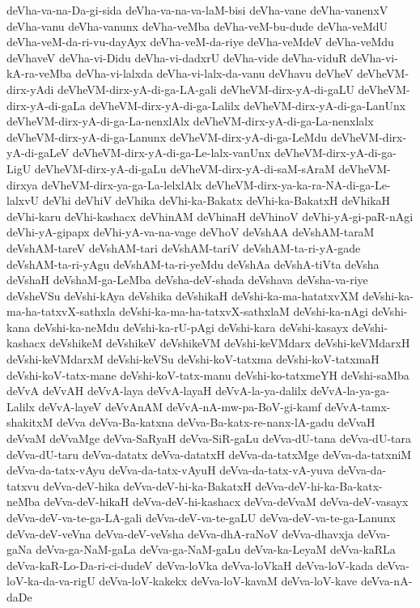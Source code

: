 {deVha-va-na-Da-gi-sida
deVha-va-na-va-laM-bisi
deVha-vane
deVha-vanenxV
deVha-vanu
deVha-vanunx
deVha-veMba
deVha-veM-bu-dude
deVha-veMdU
deVha-veM-da-ri-vu-dayAyx
deVha-veM-da-riye
deVha-veMdeV
deVha-veMdu
deVhaveV
deVha-vi-Didu
deVha-vi-dadxrU
deVha-vide
deVha-viduR
deVha-vi-kA-ra-veMba
deVha-vi-lalxda
deVha-vi-lalx-da-vanu
deVhavu
deVheV
deVheVM-dirx-yAdi
deVheVM-dirx-yA-di-ga-LA-gali
deVheVM-dirx-yA-di-gaLU
deVheVM-dirx-yA-di-gaLa
deVheVM-dirx-yA-di-ga-Lalilx
deVheVM-dirx-yA-di-ga-LanUnx
deVheVM-dirx-yA-di-ga-La-nenxlAlx
deVheVM-dirx-yA-di-ga-La-nenxlalx
deVheVM-dirx-yA-di-ga-Lanunx
deVheVM-dirx-yA-di-ga-LeMdu
deVheVM-dirx-yA-di-gaLeV
deVheVM-dirx-yA-di-ga-Le-lalx-vanUnx
deVheVM-dirx-yA-di-ga-LigU
deVheVM-dirx-yA-di-gaLu
deVheVM-dirx-yA-di-saM-sAraM
deVheVM-dirxya
deVheVM-dirx-ya-ga-La-lelxlAlx
deVheVM-dirx-ya-ka-ra-NA-di-ga-Le-lalxvU
deVhi
deVhiV
deVhika
deVhi-ka-Bakatx
deVhi-ka-BakatxH
deVhikaH
deVhi-karu
deVhi-kashacx
deVhinAM
deVhinaH
deVhinoV
deVhi-yA-gi-paR-nAgi
deVhi-yA-gipapx
deVhi-yA-va-na-vage
deVhoV
deVshAA
deVshAM-taraM
deVshAM-tareV
deVshAM-tari
deVshAM-tariV
deVshAM-ta-ri-yA-gade
deVshAM-ta-ri-yAgu
deVshAM-ta-ri-yeMdu
deVshAa
deVshA-tiVta
deVsha
deVshaH
deVshaM-ga-LeMba
deVsha-deV-shada
deVshava
deVsha-va-riye
deVsheVSu
deVshi-kAya
deVshika
deVshikaH
deVshi-ka-ma-hatatxvXM
deVshi-ka-ma-ha-tatxvX-sathxla
deVshi-ka-ma-ha-tatxvX-sathxlaM
deVshi-ka-nAgi
deVshi-kana
deVshi-ka-neMdu
deVshi-ka-rU-pAgi
deVshi-kara
deVshi-kasayx
deVshi-kashacx
deVshikeM
deVshikeV
deVshikeVM
deVshi-keVMdarx
deVshi-keVMdarxH
deVshi-keVMdarxM
deVshi-keVSu
deVshi-koV-tatxma
deVshi-koV-tatxmaH
deVshi-koV-tatx-mane
deVshi-koV-tatx-manu
deVshi-ko-tatxmeYH
deVshi-saMba
deVvA
deVvAH
deVvA-laya
deVvA-layaH
deVvA-la-ya-dalilx
deVvA-la-ya-ga-Lalilx
deVvA-layeV
deVvAnAM
deVvA-nA-mw-pa-BoV-gi-kamf
deVvA-tamx-shakitxM
deVva
deVva-Ba-katxna
deVva-Ba-katx-re-nanx-lA-gadu
deVvaH
deVvaM
deVvaMge
deVva-SaRyaH
deVva-SiR-gaLu
deVva-dU-tana
deVva-dU-tara
deVva-dU-taru
deVva-datatx
deVva-datatxH
deVva-da-tatxMge
deVva-da-tatxniM
deVva-da-tatx-vAyu
deVva-da-tatx-vAyuH
deVva-da-tatx-vA-yuva
deVva-da-tatxvu
deVva-deV-hika
deVva-deV-hi-ka-BakatxH
deVva-deV-hi-ka-Ba-katx-neMba
deVva-deV-hikaH
deVva-deV-hi-kashacx
deVva-deVvaM
deVva-deV-vasayx
deVva-deV-va-te-ga-LA-gali
deVva-deV-va-te-gaLU
deVva-deV-va-te-ga-Lanunx
deVva-deV-veVna
deVva-deV-veVsha
deVva-dhA-raNoV
deVva-dhavxja
deVva-gaNa
deVva-ga-NaM-gaLa
deVva-ga-NaM-gaLu
deVva-ka-LeyaM
deVva-kaRLa
deVva-kaR-Lo-Da-ri-ci-dudeV
deVva-loVka
deVva-loVkaH
deVva-loV-kada
deVva-loV-ka-da-va-rigU
deVva-loV-kakekx
deVva-loV-kavaM
deVva-loV-kave
deVva-nA-daDe
}
